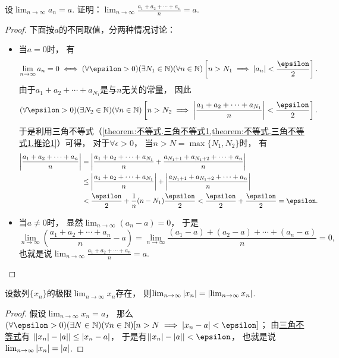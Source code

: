 \begin{example}\label{example:极限.数列的算术平均的极限}
设\(\lim_{n\to\infty} a_n = a\).
证明：\(\lim_{n\to\infty} \frac{a_1+a_2+\dotsb+a_n}{n} = a\).
\begin{proof}
下面按\(a\)的不同取值，分两种情况讨论：
\begin{itemize}
	\item 当\(a=0\)时，
	有\[
		\lim_{n\to\infty} a_n = 0
		\iff
		(\forall\epsilon>0)
		(\exists N_1\in\mathbb{N})
		(\forall n\in\mathbb{N})
		\left[n>N_1 \implies \abs{a_n}<\frac\epsilon2\right].
	\]
	由于\(a_1 + a_2 + \dotsb + a_{N_1}\)是与\(n\)无关的常量，
	因此\[
		(\forall\epsilon>0)
		(\exists N_2\in\mathbb{N})
		(\forall n\in\mathbb{N})
		\left[
			n>N_2
			\implies
			\abs{\frac{a_1 + a_2 + \dotsb + a_{N_1}}{n}} < \frac\epsilon2
		\right].
	\]
	于是利用三角不等式（\cref{theorem:不等式.三角不等式1,theorem:不等式.三角不等式1.推论1}）可得，
	对于\(\forall\epsilon>0\)，
	当\(n>N=\max\{N_1,N_2\}\)时，
	有\begin{align*}
		\abs{\frac{a_1 + a_2 + \dotsb + a_n}{n}}
		&= \abs{
			\frac{a_1 + a_2 + \dotsb + a_{N_1}}{n}
			+ \frac{a_{N_1+1} + a_{N_1+2} + \dotsb + a_n}{n}
		} \\
		&\leq \abs{\frac{a_1 + a_2 + \dotsb + a_{N_1}}{n}}
		+ \abs{\frac{a_{N_1+1} + a_{N_1+2} + \dotsb + a_n}{n}} \\
		&< \frac\epsilon2 + \frac1n (n-N_1) \frac\epsilon2
		< \frac\epsilon2 + \frac\epsilon2
		= \epsilon.
	\end{align*}

	\item 当\(a\neq0\)时，
	显然\(\lim_{n\to\infty} (a_n - a) = 0\)，
	于是\[
		\lim_{n\to\infty} \left(\frac{a_1+a_2+\dotsb+a_n}{n}-a\right)
		= \lim_{n\to\infty} \frac{(a_1-a)+(a_2-a)+\dotsb+(a_n-a)}{n}
		= 0,
	\]
	也就是说\(\lim_{n\to\infty} \frac{a_1+a_2+\dotsb+a_n}{n} = a\).
	\qedhere
\end{itemize}
\end{proof}
\end{example}

\begin{proposition}\label{theorem:极限.数列的绝对值的极限}
设数列\(\{x_n\}\)的极限\(\lim_{n\to\infty} x_n\)存在，
则\(\lim_{n\to\infty} \abs{x_n} = \abs{\lim_{n\to\infty} x_n}\).
\begin{proof}
假设\(\lim_{n\to\infty} x_n = a\)，
那么\((\forall\epsilon>0)
(\exists N\in\mathbb{N})
(\forall n\in\mathbb{N})
[n>N \implies \abs{x_n - a} < \epsilon]\)；
由\hyperref[theorem:不等式.三角不等式2]{三角不等式}有
\(\abs{\abs{x_n} - \abs{a}} \leq \abs{x_n - a}\)，
于是有\(\abs{\abs{x_n} - \abs{a}} < \epsilon\)，
也就是说\(\lim_{n\to\infty} \abs{x_n} = \abs{a}\).
\end{proof}
\end{proposition}

